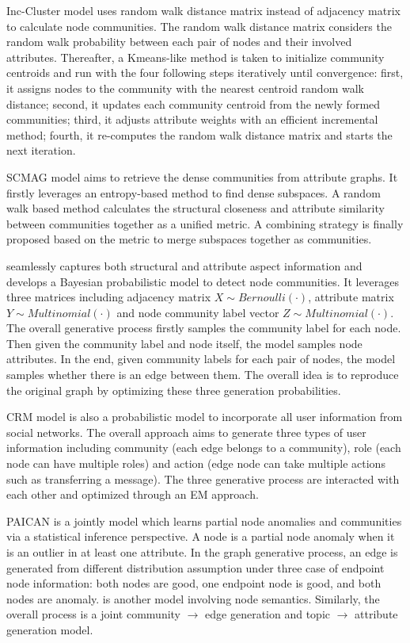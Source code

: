 Inc-Cluster model \cite{zhou2010clustering}  uses random walk distance matrix instead of adjacency matrix to calculate node communities. The random walk distance matrix considers the random walk probability between each pair of nodes and their involved attributes. Thereafter, a Kmeans-like method is taken to initialize community centroids and run with the four following steps iteratively until convergence: first,  it assigns nodes to the community with the nearest centroid random walk distance; second, it updates each community centroid from the newly formed communities; third, it adjusts attribute weights with an efficient incremental method; fourth, it re-computes the random walk distance matrix and starts the next iteration. 

SCMAG model \cite{huang2015dense} aims to retrieve the dense communities from attribute graphs. It firstly leverages an entropy-based method to find dense subspaces. A random walk based method calculates the structural closeness and attribute similarity between communities together as a unified metric. A combining strategy is finally proposed based on the metric to merge subspaces together as communities. 

\cite{xu2012model} seamlessly captures both structural and attribute aspect information and develops a Bayesian probabilistic model to detect node communities. It leverages three matrices including adjacency matrix $X \sim Bernoulli(\cdot)$, attribute matrix $Y \sim Multinomial(\cdot)$ and node community label vector $Z \sim Multinomial(\cdot)$. The overall generative process firstly samples the community label for each node. Then given the community label and node itself, the model samples node attributes. In the end, given community labels for each pair of nodes, the model samples whether there is an edge between them. The overall idea is to reproduce the original graph by optimizing these three generation probabilities.

CRM model  \cite{han2015probabilistic} is also a probabilistic model to incorporate all user information from social networks. The overall approach aims to generate three types of user information including community (each edge belongs to a community), role (each node can have multiple roles) and action (edge node can take multiple actions such as transferring a message). The three generative process are interacted with each other and optimized through an EM approach. 

PAICAN  \cite{bojchevski2018bayesian} is a jointly model which learns partial node anomalies and communities via a statistical inference perspective. A node is a partial node anomaly when it is an outlier in at least one attribute. In the graph generative process, an edge is generated from different distribution assumption under three case of endpoint node information: both nodes are good,  one endpoint node is good, and both nodes are anomaly. \cite{he2017joint}  is another model involving node semantics. Similarly, the overall process is a joint community $\rightarrow$ edge generation and topic $\rightarrow$ attribute generation model.
 
